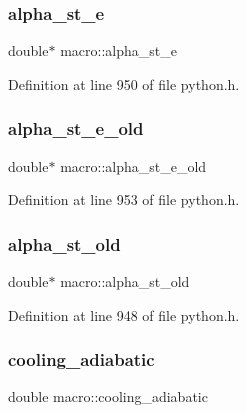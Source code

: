 \subsubsection{\texorpdfstring{alpha\+\_\+st\+\_\+e}{alpha\_st\_e}}
{\footnotesize\ttfamily double$\ast$ macro\+::alpha\+\_\+st\+\_\+e}



Definition at line 950 of file python.\+h.

\mbox{\label{structmacro_aaeec36e5a5ced5d7d0e8e4619e8f7cb7}} 
\subsubsection{\texorpdfstring{alpha\+\_\+st\+\_\+e\+\_\+old}{alpha\_st\_e\_old}}
{\footnotesize\ttfamily double$\ast$ macro\+::alpha\+\_\+st\+\_\+e\+\_\+old}



Definition at line 953 of file python.\+h.

\mbox{\label{structmacro_adc584bf7d87a213e34b03a3631078c4d}} 
\subsubsection{\texorpdfstring{alpha\+\_\+st\+\_\+old}{alpha\_st\_old}}
{\footnotesize\ttfamily double$\ast$ macro\+::alpha\+\_\+st\+\_\+old}



Definition at line 948 of file python.\+h.

\mbox{\label{structmacro_a8e77cd87d57475d0c53aab45ad0e78cf}} 
\subsubsection{\texorpdfstring{cooling\+\_\+adiabatic}{cooling\_adiabatic}}
{\footnotesize\ttfamily double macro\+::cooling\+\_\+adiabatic}



